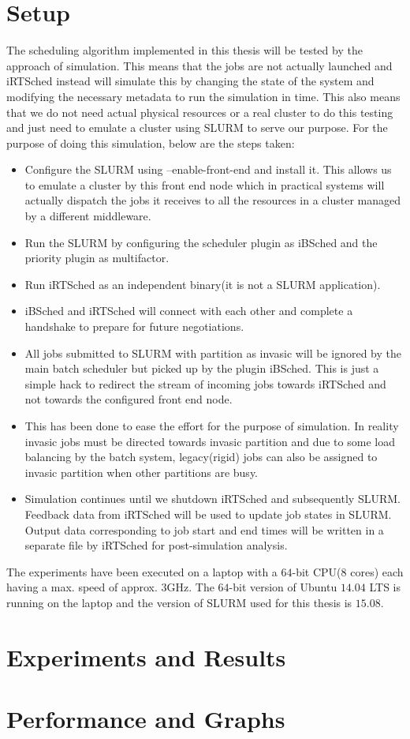 \section{Setup}
The scheduling algorithm implemented in this thesis will be tested by the approach of simulation. This means that the jobs are not actually launched and iRTSched instead will simulate this by changing the state of the system and modifying the necessary metadata to run the simulation in time. This also means that we do not need actual physical resources or a real cluster to do this testing and just need to emulate a cluster using SLURM to serve our purpose. For the purpose of doing this simulation, below are the steps taken:
\begin{itemize}
\item Configure the SLURM using --enable-front-end and install it. This allows us to emulate a cluster by this front end node which in practical systems will actually dispatch the jobs it receives to all the resources in a cluster managed by a different middleware.
\item Run the SLURM by configuring the scheduler plugin as iBSched and the priority plugin as multifactor.
\item Run iRTSched as an independent binary(it is not a SLURM application).
\item iBSched and iRTSched will connect with each other and complete a handshake to prepare for future negotiations.
\item All jobs submitted to SLURM with partition as invasic will be ignored by the main batch scheduler but picked up by the plugin iBSched. This is just a simple hack to redirect the stream of incoming jobs towards iRTSched and not towards the configured front end node. 
\item This has been done to ease the effort for the purpose of simulation. In reality invasic jobs must be directed towards invasic partition and due to some load balancing by the batch system, legacy(rigid) jobs can also be assigned to invasic partition when other partitions are busy. 
\item Simulation continues until we shutdown iRTSched and subsequently SLURM. Feedback data from iRTSched will be used to update job states in SLURM. Output data corresponding to job start and end times will be written in a separate file by iRTSched for post-simulation analysis.
\end{itemize}
The experiments have been executed on a laptop with a $64$-bit CPU($8$ cores) each having a max. speed of approx. $3$GHz. The $64$-bit version of Ubuntu $14.04$ LTS is running on the laptop and the version of SLURM used for this thesis is $15.08$.
\section{Experiments and Results}
\section{Performance and Graphs}
